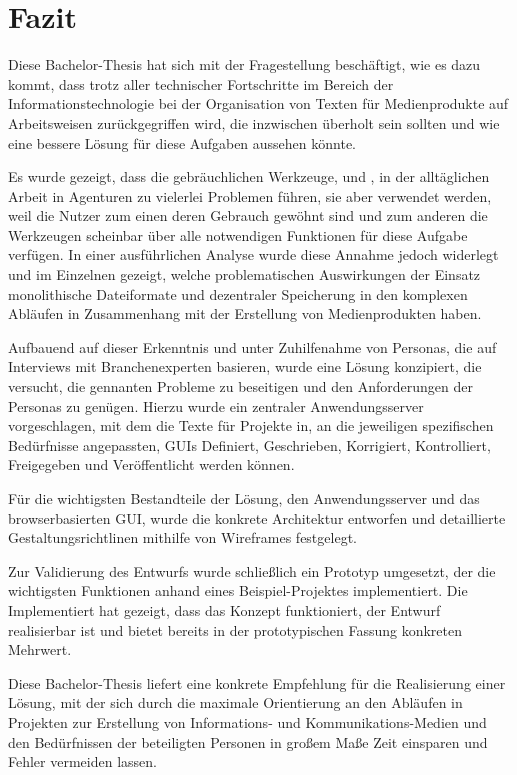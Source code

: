 \section{Fazit}\label{l:fazit}

Diese Bachelor-Thesis hat sich mit der Fragestellung beschäftigt, wie es dazu kommt, dass trotz aller technischer Fortschritte im Bereich der Informationstechnologie bei der Organisation von Texten für Medienprodukte auf Arbeitsweisen zurückgegriffen wird, die inzwischen überholt sein sollten und wie eine bessere Lösung für diese Aufgaben aussehen könnte.

Es wurde gezeigt, dass die gebräuchlichen Werkzeuge,  und , in der alltäglichen Arbeit in Agenturen zu vielerlei Problemen führen, sie aber verwendet werden, weil die Nutzer zum einen deren Gebrauch gewöhnt sind und zum anderen die Werkzeugen scheinbar über alle notwendigen Funktionen für diese Aufgabe verfügen. In einer ausführlichen Analyse wurde diese Annahme jedoch widerlegt und im Einzelnen gezeigt, welche problematischen Auswirkungen der Einsatz monolithische Dateiformate und dezentraler Speicherung in den komplexen Abläufen in Zusammenhang mit der Erstellung von Medienprodukten haben.

Aufbauend auf dieser Erkenntnis und unter Zuhilfenahme von Personas, die auf Interviews mit Branchenexperten basieren, wurde eine Lösung konzipiert, die versucht, die gennanten Probleme zu beseitigen und den Anforderungen der Personas zu genügen. Hierzu wurde ein zentraler Anwendungsserver vorgeschlagen, mit dem die Texte für Projekte in, an die jeweiligen spezifischen Bedürfnisse angepassten, GUIs Definiert, Geschrieben, Korrigiert, Kontrolliert, Freigegeben und Veröffentlicht werden können.

Für die wichtigsten Bestandteile der Lösung, den Anwendungsserver und das browserbasierten GUI, wurde die konkrete Architektur entworfen und detaillierte Gestaltungsrichtlinen mithilfe von Wireframes festgelegt. 

Zur Validierung des Entwurfs wurde schließlich ein Prototyp umgesetzt, der die wichtigsten Funktionen anhand eines Beispiel-Projektes implementiert. Die Implementiert hat gezeigt, dass das Konzept funktioniert, der Entwurf realisierbar ist und bietet bereits in der prototypischen Fassung konkreten Mehrwert.

\secbar

Diese Bachelor-Thesis liefert eine konkrete Empfehlung für die Realisierung einer Lösung, mit der sich durch die maximale Orientierung an den Abläufen in Projekten zur Erstellung von Informations- und Kommunikations-Medien und den Bedürfnissen der beteiligten Personen in großem Maße Zeit einsparen und Fehler vermeiden lassen.

\pagebreak